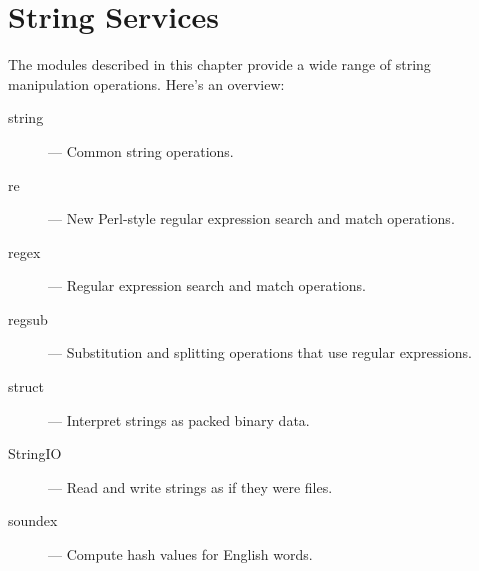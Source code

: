 \chapter{String Services}

The modules described in this chapter provide a wide range of string
manipulation operations.  Here's an overview:

\begin{description}

\item[string]
--- Common string operations.

\item[re]
--- New Perl-style regular expression search and match operations.

\item[regex]
--- Regular expression search and match operations.

\item[regsub]
--- Substitution and splitting operations that use regular expressions.

\item[struct]
--- Interpret strings as packed binary data.

\item[StringIO]
--- Read and write strings as if they were files.

\item[soundex]
--- Compute hash values for English words.

\end{description}
